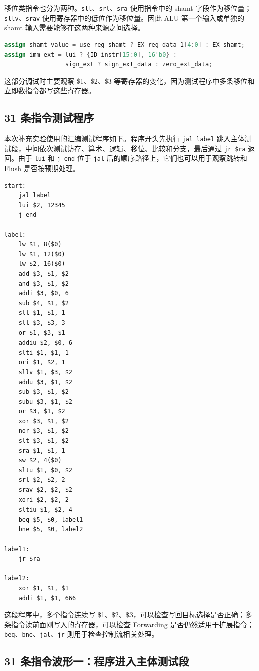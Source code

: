 \documentclass[UTF8,zihao=-4]{ctexart}
\begin{document}
移位类指令也分为两种。\texttt{sll}、\texttt{srl}、\texttt{sra} 使用指令中的 shamt 字段作为移位量；\texttt{sllv}、\texttt{srav} 使用寄存器中的低位作为移位量。因此 ALU 第一个输入或单独的 shamt 输入需要能够在这两种来源之间选择。

\begin{lstlisting}[language=Verilog]
assign shamt_value = use_reg_shamt ? EX_reg_data_1[4:0] : EX_shamt;
assign imm_ext = lui ? {ID_instr[15:0], 16'b0} :
                 sign_ext ? sign_ext_data : zero_ext_data;
\end{lstlisting}

这部分调试时主要观察 \$1、\$2、\$3 等寄存器的变化，因为测试程序中多条移位和立即数指令都写这些寄存器。

\subsection{31 条指令测试程序}

本次补充实验使用的汇编测试程序如下。程序开头先执行 \texttt{jal label} 跳入主体测试段，中间依次测试访存、算术、逻辑、移位、比较和分支，最后通过 \texttt{jr \$ra} 返回。由于 \texttt{lui} 和 \texttt{j end} 位于 \texttt{jal} 后的顺序路径上，它们也可以用于观察跳转和 Flush 是否按预期处理。

\begin{lstlisting}[language={}]
start:
    jal label
    lui $2, 12345
    j end

label:
    lw $1, 8($0)
    lw $1, 12($0)
    lw $2, 16($0)
    add $3, $1, $2
    and $3, $1, $2
    addi $3, $0, 6
    sub $4, $1, $2
    sll $1, $1, 1
    sll $3, $3, 3
    or $1, $3, $1
    addiu $2, $0, 6
    slti $1, $1, 1
    ori $1, $2, 1
    sllv $1, $3, $2
    addu $3, $1, $2
    sub $3, $1, $2
    subu $3, $1, $2
    or $3, $1, $2
    xor $3, $1, $2
    nor $3, $1, $2
    slt $3, $1, $2
    sra $1, $1, 1
    sw $2, 4($0)
    sltu $1, $0, $2
    srl $2, $2, 2
    srav $2, $2, $2
    xori $2, $2, 2
    sltiu $1, $2, 4
    beq $5, $0, label1
    bne $5, $0, label2

label1:
    jr $ra

label2:
    xor $1, $1, $1
    addi $1, $1, 666
\end{lstlisting}

这段程序中，多个指令连续写 \$1、\$2、\$3，可以检查写回目标选择是否正确；多条指令读前面刚写入的寄存器，可以检查 Forwarding 是否仍然适用于扩展指令；\texttt{beq}、\texttt{bne}、\texttt{jal}、\texttt{jr} 则用于检查控制流相关处理。

\subsection{31 条指令波形一：程序进入主体测试段}
\end{document}
